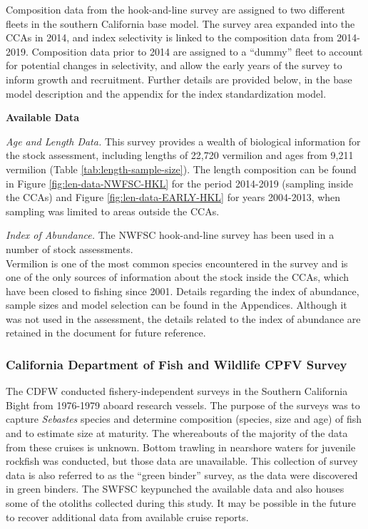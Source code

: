 \documentclass[
  english,
  a4paper,
]{article}
\begin{document}
Composition data from the hook-and-line survey are assigned to two different
fleets in the southern California base model. The survey area expanded into the
CCAs in 2014, and index selectivity is linked to the composition data from 2014-2019.
Composition data prior to 2014 are assigned to a ``dummy'' fleet to account for
potential changes in selectivity, and allow the early years of the survey to
inform growth and recruitment. Further details are provided below, in the base
model description and the appendix for the index standardization model.

\textbf{Available Data}

\emph{Age and Length Data.} This survey provides a wealth of biological information for the
stock assessment, including lengths of 22,720 vermilion and ages from 9,211 vermilion (Table \ref{tab:length-sample-size}).
The length composition can be found in Figure \ref{fig:len-data-NWFSC-HKL} for
the period 2014-2019 (sampling inside the CCAs) and Figure \ref{fig:len-data-EARLY-HKL}
for years 2004-2013, when sampling was limited to areas outside the CCAs.

\emph{Index of Abundance.}
The NWFSC hook-and-line survey has been used in a number of stock assessments.\\
Vermilion is one of the most common species encountered in the survey and is one
of the only sources of information about the stock inside the CCAs, which have
been closed to fishing since 2001. Details regarding the
index of abundance, sample sizes and model selection can be found in the Appendices.
Although it was not used in the assessment, the details related to the index of
abundance are retained in the document for future reference.

\hypertarget{california-department-of-fish-and-wildlife-cpfv-survey}{%
\subsubsection{California Department of Fish and Wildlife CPFV Survey}\label{california-department-of-fish-and-wildlife-cpfv-survey}}

The CDFW conducted fishery-independent surveys in the Southern California Bight
from 1976-1979 aboard research vessels. The purpose of the surveys
was to capture \emph{Sebastes} species and determine composition (species, size and age) of
fish and to estimate size at maturity. The whereabouts of the majority of the
data from these cruises is unknown. Bottom trawling in nearshore waters for juvenile
rockfish was conducted, but those data are unavailable.
This collection of survey data is also referred to as the
``green binder'' survey, as the data were discovered in green binders.
The SWFSC keypunched the available data and also houses some of the otoliths
collected during this study. It may be possible in the future to recover additional
data from available cruise reports.
\end{document}
